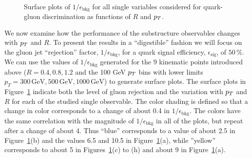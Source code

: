 \begin{figure}
\\
\caption{Surface plots of $1/\epsilon_\text{bkg}$ for all single variables considered for
  quark-gluon discrimination as functions of $R$ and $p_T$. }
\label{fig:qg_surface_single}
\end{figure}
%

We now examine how the performance of the substructure observables changes with $p_T$ and $R$.  To present the results in a ``digestible'' fashion
we will focus on the gluon jet ``rejection'' factor, $1/\epsilon_\text{bkg}$, for a quark signal efficiency, $\epsilon_\text{sig}$, of $50\,\%$.
We can use the values of $1/\epsilon_\text{bkg}$ generated for the 9 kinematic points introduced above ($R = 0.4, 0.8, 1.2$ and 
the 100 GeV $p_T$ bins with lower limits
$p_T = 300\, \text{GeV}, 500\, \text{GeV}, 1000\,\text{GeV}$) to generate surface plots.  The surface plots in Figure~\ref{fig:qg_surface_single}
indicate both the level of gluon rejection
and the variation with $p_T$ and $R$ for each of the studied single observable.  The color shading is defined so that a change in color 
corresponds to a change of about 0.4 in $1/\epsilon_\text{bkg}$.  The colors have the same correlation with the magnitude of $1/\epsilon_\text{bkg}$
in all of the plots, but repeat after a change of about 4.  Thus ``blue'' corresponds to a value of about 2.5 in  Figure~\ref{fig:qg_surface_single}(b) and the
values 6.5 and 10.5
in  Figure~\ref{fig:qg_surface_single}(a), while ''yellow'' corresponds to about 5 in  Figures~\ref{fig:qg_surface_single}(c) to (h) and about 9 in
 Figure~\ref{fig:qg_surface_single}(a).

